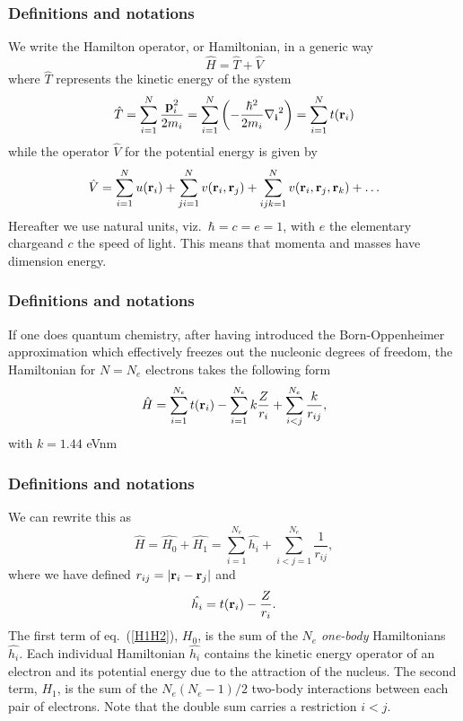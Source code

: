 \documentclass[compress]{beamer}
\begin{document}
\frame
{
  \frametitle{Definitions and notations}
\begin{small}
{\scriptsize
We write the Hamilton operator, or Hamiltonian,  in a generic way 
\[
	\hat{H} = \hat{T} + \hat{V} 
\]
where $\hat{T}$  represents the kinetic energy of the system
\[
	\hat{T} = \sum_{i=1}^N \frac{\mathbf{p}_i^2}{2m_i} = \sum_{i=1}^N \left( -\frac{\hbar^2}{2m_i} \mathbf{\nabla_i}^2 \right) =
		\sum_{i=1}^N t({\bf r}_i)
\]
while the operator $\hat{V}$ for the potential energy is given by
\begin{equation}
	\hat{V} = \sum_{i=1}^N u({\bf r}_i) + \sum_{ji=1}^N v({\bf r}_i,{\bf r}_j)+\sum_{ijk=1}^Nv({\bf r}_i,{\bf r}_j,{\bf r}_k)+\dots
\label{eq:firstv}
\end{equation}
Hereafter we use natural units, viz.~$\hbar=c=e=1$, with $e$ the elementary chargeand $c$ the speed of light. This means that momenta and masses
have dimension energy. 
}
\end{small}
}
\frame
{
  \frametitle{Definitions and notations}
\begin{small}
{\scriptsize
If one does quantum chemistry, after having introduced the  Born-Oppenheimer approximation which effectively freezes out the nucleonic degrees
of freedom, the Hamiltonian for $N=N_e$ electrons takes the following form 
\[
  \hat{H} = \sum_{i=1}^{N_e} t({\bf r}_i) 
  - \sum_{i=1}^{N_e} k\frac{Z}{r_i} + \sum_{i<j}^{N_e} \frac{k}{r_{ij}},
\]
with $k=1.44$ eVnm
}
\end{small}
}

\frame
{
  \frametitle{Definitions and notations}
\begin{small}
{\scriptsize
 We can rewrite this as
\begin{equation}
    \hat{H} = \hat{H_0} + \hat{H_1} 
    = \sum_{i=1}^{N_e}\hat{h_i} + \sum_{i<j=1}^{N_e}\frac{1}{r_{ij}},
\label{H1H2}
\end{equation}
where  we have defined $r_{ij}=| {\bf r}_i-{\bf r}_j|$ and
\begin{equation}
  \hat{h_i} =  t({\bf r}_i) - \frac{Z}{r_i}.
\label{hi}
\end{equation}
The first term of eq.~(\ref{H1H2}), $H_0$, is the sum of the $N_e$
\emph{one-body} Hamiltonians $\hat{h_i}$. Each individual
Hamiltonian $\hat{h_i}$ contains the kinetic energy operator of an
electron and its potential energy due to the attraction of the
nucleus. The second term, $H_1$, is the sum of the $N_e(N_e-1)/2$
two-body interactions between each pair of electrons. Note that the double sum carries a restriction $i<j$.
}
\end{small}
}
\end{document}
